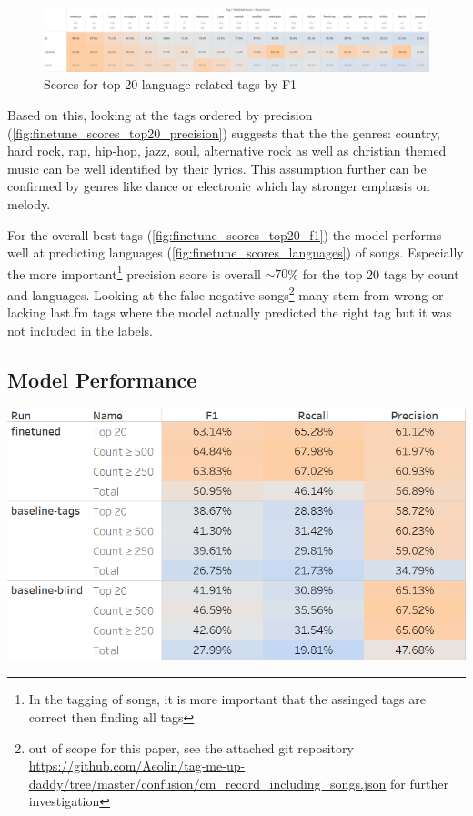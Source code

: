 \documentclass[a4paper,12pt]{scrartcl}
\begin{document}
\begin{figure}[h]
    \includegraphics[width=\textwidth]{media/Scores For Languages.png}   
    \caption{Scores for top 20 language related tags by F1}
    \label{fig:finetune_scores_languages}
\end{figure}


\begin{multicols}{2}
Based on this, looking at the tags ordered by precision (\autoref{fig:finetune_scores_top20_precision}) suggests that the the genres: country, hard rock, rap, hip-hop, jazz, soul, alternative rock as well as christian themed music can be well identified by their lyrics. This assumption further can be confirmed by genres like dance or electronic which lay stronger emphasis on melody.

For the overall best tags (\autoref{fig:finetune_scores_top20_f1}) the model performs well at predicting languages (\autoref{fig:finetune_scores_languages}) of songs. Especially the more important\footnote[9]{In the tagging of songs, it is more important that the assinged tags are correct then finding all tags} precision score is overall $\sim70$\% for the top 20 tags by count and languages. Looking at the false negative songs\footnote[10]{out of scope for this paper, see the attached git repository \url{https://github.com/Aeolin/tag-me-up-daddy/tree/master/confusion/cm_record_including_songs.json} for further investigation} many stem from wrong or lacking last.fm tags where the model actually predicted the right tag but it was not included in the labels.

\subsection{Model Performance}



\begin{Figure}
    \includegraphics[width=\textwidth]{media/Run Comparison.png}
    \label{fig:comparison}
\end{Figure}


\end{multicols}
\end{document}
